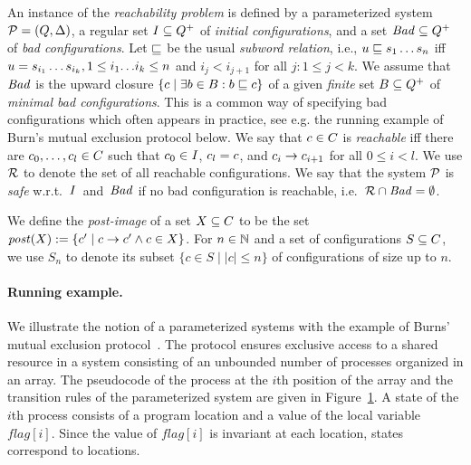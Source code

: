 \vspace{1ex}%
An instance of the \emph{reachability problem} is defined by a
parameterized system ${\mathcal P} = (Q,\Delta)$, a regular set
$\mathit{I}\subseteq Q^+$ of \emph{initial configurations}, and a set
$\mathit{Bad}\subseteq Q^+$ of \emph{bad configurations}.  Let $\sqsubseteq$
be the usual \emph{subword relation}, i.e.,
$u\sqsubseteq s_1\ldots s_n$ iff $u=s_{i_1}\ldots s_{i_k},1\leq
i_1{\ldots}i_k\leq n$ and $i_j<i_{j+1}$ for all $j:1\leq j < k$.  We assume
that $\mathit{Bad}$ is the upward closure $\{c\mid\exists b
\in B:b\sqsubseteq c\}$ of a given \emph{finite} set
$B\subseteq Q^+$ of \emph{minimal bad configurations}.  This
is a common way of specifying bad configurations which often appears
in practice, see e.g. the running example of Burn's mutual exclusion
protocol below.  We say that $c\in C$ is \emph{reachable} iff
there are $c_0,\ldots, c_l\in C$ such that $c_0\in
\mathit{I}$, $c_l = c$, and $c_i\rightarrow c_{i+1}$ for
all $0\leq i < l$.  We use $\mathcal{R}$ to denote the set of all reachable
configurations.  We say that the system ${\mathcal P}$ is \emph{safe} w.r.t.\
$\mathit{I}$~and~$\mathit{Bad}$ if no bad configuration is reachable, i.e.\
$\mathcal{R}\cap\mathit{Bad} = \emptyset$.

We define the \emph{post-image} of a set $X\subseteq C$ to be the
set $\mathit{post}(X) := \{c'\mid c\rightarrow c'\wedge c\in X\}$.
%
For $n\in\mathbb N$ and a set of configurations $S \subseteq C$, we
use $S_n$ to denote its subset $\{c\in S\mid |c|{\leq}n\}$ of
configurations of size up to $n$.
%
%
%

\paragraph{Running example.}
\newcommand{\bubblestate}[2]{\tikz[baseline=(n.base)]\node[state,fill=#2,scale=0.7](n){#1};}
\begin{figure}[!b]
  
  \label{figure:Burns}
\end{figure}
We illustrate the notion of a parameterized systems with the example
of Burns' mutual exclusion protocol~\cite{burnsinside}.
%
The protocol ensures exclusive access to a shared resource in a system
consisting of an unbounded number of processes organized in an array.
%
The pseudocode of the process at the $i$th position of the array and
the transition rules of the parameterized system are given in
Figure~\ref{figure:Burns}.
%
A state of the $i$th process consists of a program location and a
value of the local variable $\mathit{flag}[i]$. Since the value of
$\mathit{flag}[i]$ is invariant at each location, states correspond to
locations.

